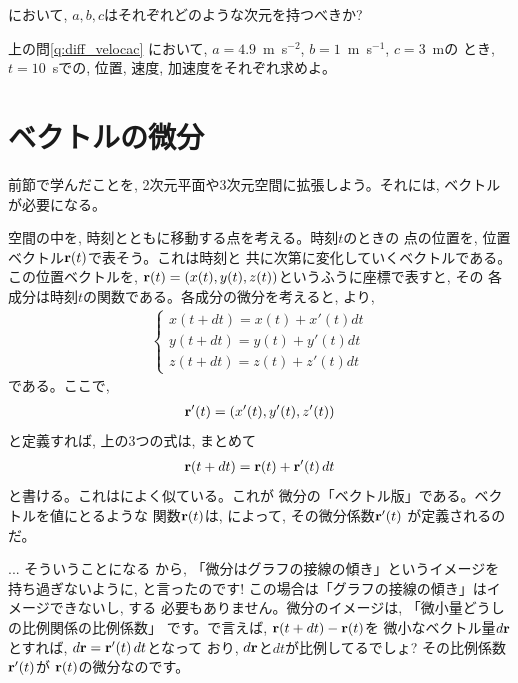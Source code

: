 \begin{q}\label{q:diff_velocac1} 
において, $a, b, c$はそれぞれどのような次元を持つべきか?\end{q}

\begin{q}\label{q:diff_velocac2} 上の問\ref{q:diff_velocac}
において, $a=4.9$~m~s$^{-2}$, $b=1$~m~s$^{-1}$, $c=3$~mの
とき, $t=10$~sでの, 位置, 速度, 加速度をそれぞれ求めよ。
\end{q}


\section{ベクトルの微分}

前節で学んだことを, 2次元平面や3次元空間に拡張しよう。それには, 
ベクトルが必要になる。

空間の中を, 時刻とともに移動する点を考える。時刻$t$のときの
点の位置を, 位置ベクトル${\bf r}(t)$で表そう。これは時刻と
共に次第に変化していくベクトルである。この位置ベクトルを, 
${\bf r}(t)=(x(t), y(t), z(t))$というふうに座標で表すと, その
各成分は時刻$t$の関数である。各成分の微分を考えると, 
より, 
\begin{eqnarray}\begin{cases}
x(t+dt)=x(t)+x'(t)dt\\
y(t+dt)=y(t)+y'(t)dt\\
z(t+dt)=z(t)+z'(t)dt
\end{cases}\end{eqnarray}
である。ここで, 
\begin{eqnarray}
{\bf r}'(t)=(x'(t), y'(t), z'(t))
\end{eqnarray}
と定義すれば, 上の3つの式は, まとめて
\begin{eqnarray}
{\bf r}(t+dt)={\bf r}(t)+{\bf r}'(t)\,dt\label{eq:diff_rt}
\end{eqnarray}
と書ける。これはによく似ている。これが
微分の「ベクトル版」である。ベクトルを値にとるような
関数${\bf r}(t)$は, によって, その微分係数${\bf r}'(t)$
が定義されるのだ。

\begin{faq}{\small{} ... そういうことになる
から, 「微分はグラフの接線の傾き」というイメージを持ち過ぎないように, 
と言ったのです! この場合は「グラフの接線の傾き」はイメージできないし, する
必要もありません。微分のイメージは, 「微小量どうしの比例関係の比例係数」
です。で言えば, ${\bf r}(t+dt)-{\bf r}(t)$を
微小なベクトル量$d{\bf r}$とすれば, $d{\bf r}={\bf r}'(t)\,dt$となって
おり, $d{\bf r}$と$dt$が比例してるでしょ? その比例係数${\bf r}'(t)$が
${\bf r}(t)$の微分なのです。}\end{faq}

